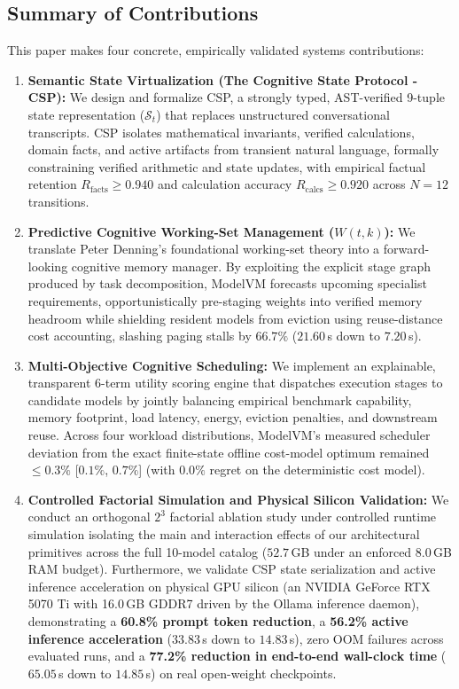 \subsection{Summary of Contributions}
\label{sec:intro_contributions}

This paper makes four concrete, empirically validated systems contributions:

\begin{enumerate}
    \item \textbf{Semantic State Virtualization (The Cognitive State Protocol - CSP):} We design and formalize CSP, a strongly typed, AST-verified 9-tuple state representation ($\mathcal{S}_t$) that replaces unstructured conversational transcripts. CSP isolates mathematical invariants, verified calculations, domain facts, and active artifacts from transient natural language, formally constraining verified arithmetic and state updates, with empirical factual retention $R_{\text{facts}} \ge 0.940$ and calculation accuracy $R_{\text{calcs}} \ge 0.920$ across $N=12$ transitions.
    \item \textbf{Predictive Cognitive Working-Set Management ($W(t, k)$):} We translate Peter Denning's foundational working-set theory into a forward-looking cognitive memory manager. By exploiting the explicit stage graph produced by task decomposition, ModelVM forecasts upcoming specialist requirements, opportunistically pre-staging weights into verified memory headroom while shielding resident models from eviction using reuse-distance cost accounting, slashing paging stalls by $66.7\%$ ($21.60$\,s down to $7.20$\,s).
    \item \textbf{Multi-Objective Cognitive Scheduling:} We implement an explainable, transparent 6-term utility scoring engine that dispatches execution stages to candidate models by jointly balancing empirical benchmark capability, memory footprint, load latency, energy, eviction penalties, and downstream reuse. Across four workload distributions, ModelVM's measured scheduler deviation from the exact finite-state offline cost-model optimum remained $\le 0.3\%$ [$0.1\%$, $0.7\%$] (with $0.0\%$ regret on the deterministic cost model).
    \item \textbf{Controlled Factorial Simulation and Physical Silicon Validation:} We conduct an orthogonal $2^3$ factorial ablation study under controlled runtime simulation isolating the main and interaction effects of our architectural primitives across the full 10-model catalog ($52.7$\,GB under an enforced $8.0$\,GB RAM budget). Furthermore, we validate CSP state serialization and active inference acceleration on physical GPU silicon (an NVIDIA GeForce RTX 5070 Ti with 16.0\,GB GDDR7 driven by the Ollama inference daemon), demonstrating a \textbf{60.8\% prompt token reduction}, a \textbf{56.2\% active inference acceleration} ($33.83$\,s down to $14.83$\,s), zero OOM failures across evaluated runs, and a \textbf{77.2\% reduction in end-to-end wall-clock time} ($65.05$\,s down to $14.85$\,s) on real open-weight checkpoints.
\end{enumerate}

